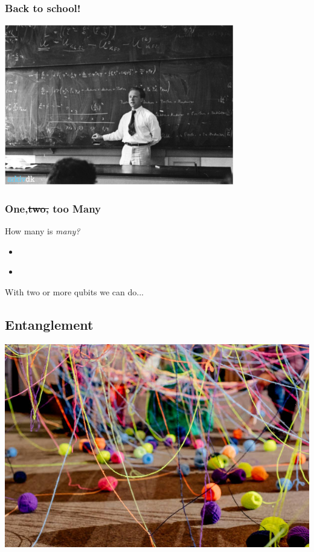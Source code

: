\documentclass[10pt]{beamer}
\begin{document}
\begin{frame}
  \frametitle{Back to school!}
  \centering
  \includegraphics[width=10cm]{img/back-to-school.png}
\end{frame}
\begin{frame}
  \frametitle{One,\sout{two,} too Many}
  How many is \emph{many?}
  \begin{itemize}
  \item<2->   
  \end{itemize}
  \begin{itemize}
  \item<7->  
  \end{itemize}

   {With two or more qubits we can do...}
\end{frame}

\begin{frame}
  \section{Entanglement}
  \centering
  \includegraphics[width=0.7\linewidth]{img/tangled-yarn.jpg}
\end{frame}
\end{document}
